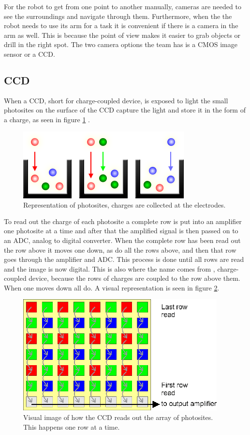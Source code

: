 \documentclass{article}
\begin{document}
For the robot to get from one point to another manually, cameras are needed to see the surroundings and navigate through them. Furthermore, when the the robot needs to use its arm for a task it is convenient if there is a camera in the arm as well. This is because the point of view makes it easier to grab objects or drill in the right spot. The two camera options the team has is a CMOS image sensor or a CCD.



\subsection{CCD}

When a CCD, short for charge-coupled device, is exposed to light the small photosites on the surface of the CCD capture the light and store it in the form of a charge, as seen in figure \ref{ccd1} .

\begin{figure}[H]
	\centering
	\includegraphics[scale=1]{figures/sensors_photosites-mono}
	\caption{Representation of photosites, charges are collected at the electrodes. }
	\label{ccd1}
\end{figure}


To read out the charge of each photosite a complete row is put into an amplifier one photosite at a time and after that the amplified signal is then passed on to an ADC, analog to digital converter. When the complete row has been read out the row above it moves one down, as do all the rows above, and then that row goes through the amplifier and ADC. This process is done until all rows are read and the image is now digital. This is also where the name comes from , charge-coupled device, because the rows of charges are coupled to the row above them. When one moves down all do. A visual representation is seen in figure \ref{ccd2}.

\begin{figure}[H]
	\centering
	\includegraphics[scale=1]{figures/ccdreadout}
	\caption{Visual image of how the CCD reads out the array of photosites. This happens one row at a time.}
	\label{ccd2}
\end{figure}
\end{document}
